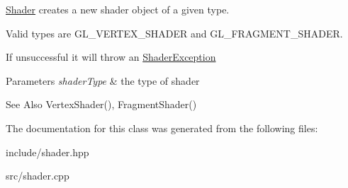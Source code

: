 \hyperlink{classogls_1_1Shader}{Shader} creates a new shader object of a given type. 

Valid types are G\-L\-\_\-\-V\-E\-R\-T\-E\-X\-\_\-\-S\-H\-A\-D\-E\-R and G\-L\-\_\-\-F\-R\-A\-G\-M\-E\-N\-T\-\_\-\-S\-H\-A\-D\-E\-R.

If unsuccessful it will throw an \hyperlink{structogls_1_1ShaderException}{Shader\-Exception}


\begin{DoxyParams}{Parameters}
{\em shader\-Type} & the type of shader \\
\hline
\end{DoxyParams}
\begin{DoxySeeAlso}{See Also}
Vertex\-Shader(), Fragment\-Shader() 
\end{DoxySeeAlso}


The documentation for this class was generated from the following files\-:\begin{DoxyCompactItemize}
\item 
include/shader.\-hpp\item 
src/shader.\-cpp\end{DoxyCompactItemize}
